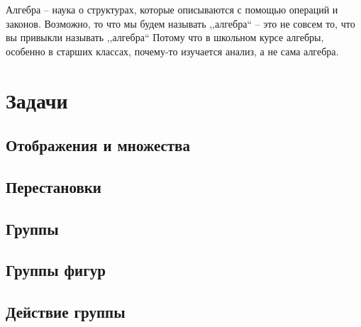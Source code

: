 \documentclass[10pt, twoside]{article}
\begin{document}
\pagestyle{empty}



\newpage

\tableofcontents
\newpage

\setcounter{page}{1}
\pagestyle{fancy}

Алгебра -- наука о структурах, которые описываются с помощью операций и законов. 
Возможно, то что мы будем называть ,,алгебра`` -- это не совсем то, что вы привыкли называть ,,алгебра`` 
Потому что в школьном курсе алгебры, особенно в старших классах, почему-то изучается анализ, а не сама алгебра.


\setcounter{section}{-1}







\newpage
\setcounter{subsection}{-1}
\renewcommand{\thesubsection}{\arabic{subsection}}

\section*{Задачи}

\subsection{Отображения и множества}

\subsection{Перестановки}

\subsection{Группы}

\subsection{Группы фигур}
 
\subsection{Действие группы}
% 
\end{document}
